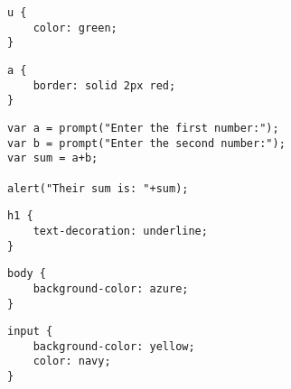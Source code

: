 \documentclass[]{memoir}
\begin{document}
\begin{lstlisting}
u {
    color: green;
}
\end{lstlisting}


\begin{lstlisting}
a {
    border: solid 2px red;
}
\end{lstlisting}


\begin{lstlisting}
var a = prompt("Enter the first number:");
var b = prompt("Enter the second number:");
var sum = a+b;

alert("Their sum is: "+sum);
\end{lstlisting}


\begin{lstlisting}
h1 {
    text-decoration: underline;
}
\end{lstlisting}


\begin{lstlisting}
body {
    background-color: azure;
}
\end{lstlisting}


\begin{lstlisting}
input {
    background-color: yellow;
    color: navy;
}
\end{lstlisting}
\end{document}
